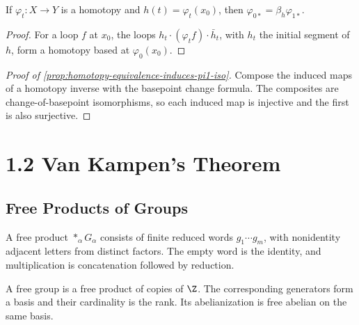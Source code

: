 \begin{lemma}
\label{lem:basepoint-change-homotopy}



If $\varphi_t:X\to Y$ is a homotopy and $h(t)=\varphi_t(x_0)$, then
$\varphi_{0*}=\beta_h\varphi_{1*}$.
\end{lemma}

\begin{proof}
\sketch For a loop $f$ at $x_0$, the loops
$h_t\cdot(\varphi_t f)\cdot\bar h_t$, with $h_t$ the initial segment of $h$,
form a homotopy based at $\varphi_0(x_0)$.
\end{proof}

\begin{proof}[Proof of \cref{prop:homotopy-equivalence-induces-pi1-iso}]
\sketch Compose the induced maps of a homotopy inverse with the basepoint
change formula. The composites are change-of-basepoint isomorphisms, so each
induced map is injective and the first is also surjective.
\end{proof}

\section{1.2 Van Kampen's Theorem}
\label{sec:van-kampen-theorem}

\subsection*{Free Products of Groups}

\begin{definition}
\label{def:free-product-of-groups}


A free product $*_\alpha G_\alpha$ consists of finite reduced words
$g_1\cdots g_m$, with nonidentity adjacent letters from distinct factors.
The empty word is the identity, and multiplication is concatenation followed
by reduction.
\end{definition}

\begin{definition}
\label{def:free-group-basis-rank}


A free group is a free product of copies of $\Z$. The corresponding generators
form a basis and their cardinality is the rank. Its abelianization is free
abelian on the same basis.
\end{definition}

